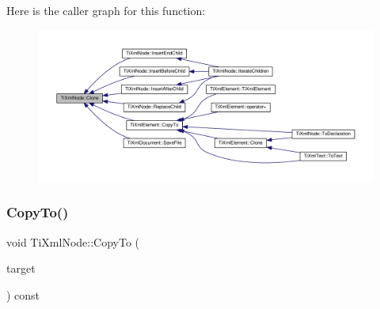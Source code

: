 Here is the caller graph for this function\+:
\nopagebreak
\begin{figure}[H]
\begin{center}
\leavevmode
\includegraphics[width=350pt]{class_ti_xml_node_a4508cc3a2d7a98e96a54cc09c37a78a4_icgraph}
\end{center}
\end{figure}
\mbox{\label{class_ti_xml_node_aaadd5bb9c94f84c4472b649b95de4a0b}} 
\subsubsection{\texorpdfstring{Copy\+To()}{CopyTo()}}
{\footnotesize\ttfamily void Ti\+Xml\+Node\+::\+Copy\+To (\begin{DoxyParamCaption}\item[{\hyperlink{class_ti_xml_node}{Ti\+Xml\+Node} $\ast$}]{target }\end{DoxyParamCaption}) const\hspace{0.3cm}{\ttfamily [protected]}}

